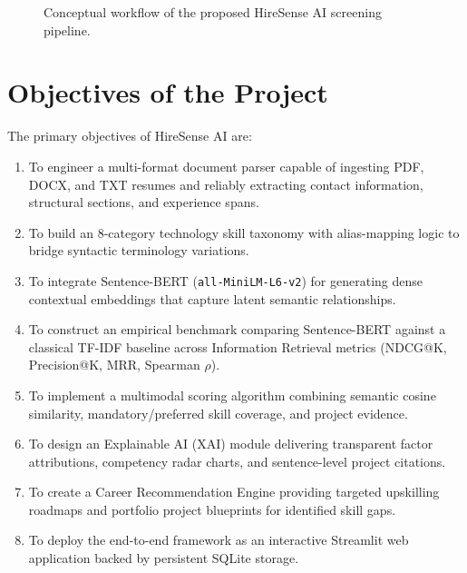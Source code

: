 \documentclass[12pt,a4paper]{report}
\begin{document}
\begin{figure}[h!]
\centering
{}
\caption{Conceptual workflow of the proposed HireSense AI screening pipeline.}
\label{fig:conceptual_workflow}
\end{figure}

\section{Objectives of the Project}
The primary objectives of HireSense AI are:
\begin{enumerate}
    \item To engineer a multi-format document parser capable of ingesting PDF, DOCX, and TXT resumes and reliably extracting contact information, structural sections, and experience spans.
    \item To build an 8-category technology skill taxonomy with alias-mapping logic to bridge syntactic terminology variations.
    \item To integrate Sentence-BERT (\texttt{all-MiniLM-L6-v2}) for generating dense contextual embeddings that capture latent semantic relationships.
    \item To construct an empirical benchmark comparing Sentence-BERT against a classical TF-IDF baseline across Information Retrieval metrics (NDCG@K, Precision@K, MRR, Spearman $\rho$).
    \item To implement a multimodal scoring algorithm combining semantic cosine similarity, mandatory/preferred skill coverage, and project evidence.
    \item To design an Explainable AI (XAI) module delivering transparent factor attributions, competency radar charts, and sentence-level project citations.
    \item To create a Career Recommendation Engine providing targeted upskilling roadmaps and portfolio project blueprints for identified skill gaps.
    \item To deploy the end-to-end framework as an interactive Streamlit web application backed by persistent SQLite storage.
\end{enumerate}
\end{document}
